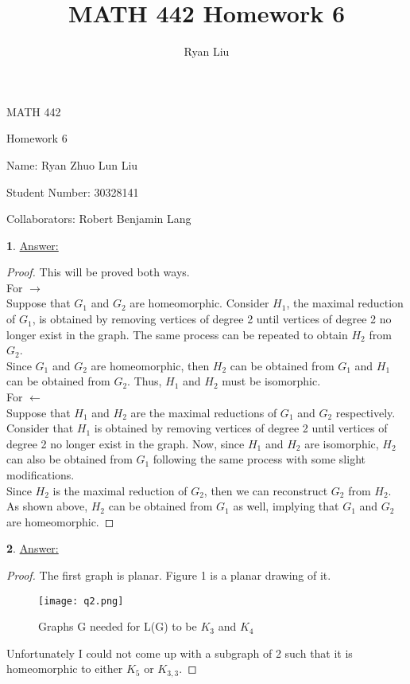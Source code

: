 \documentclass[12pt,a4paper]{article}
\author{Ryan Liu}
\title{MATH 442 Homework 6}
\theoremstyle{definition}
\newtheorem{problem}{}
\begin{document}
\begin{center}
{\huge MATH 442 \par}
{\Large Homework  6  \par}
{\normalsize Name: Ryan Zhuo Lun Liu \par}
{\normalsize Student Number: 30328141 \par}
{\normalsize Collaborators: Robert Benjamin Lang }
\end{center}

\begin{problem} \underline{Answer:}
\begin{proof} This will be proved both ways. \\
For $\rightarrow$ \\
Suppose that $G_1$ and $G_2$ are homeomorphic. Consider $H_1$, the maximal reduction of $G_1$, is obtained by removing vertices of degree 2 until vertices of degree 2 no longer exist in the graph. The same process can be repeated to obtain $H_2$ from $G_2$. \\

Since $G_1$ and $G_2$ are homeomorphic, then $H_2$ can be obtained from $G_1$ and $H_1$ can be obtained from $G_2$. Thus, $H_1$ and $H_2$ must be isomorphic. \\

For $\leftarrow$ \\
Suppose that $H_1$ and $H_2$ are the maximal reductions of $G_1$ and $G_2$ respectively. Consider that $H_1$ is obtained by removing vertices of degree 2 until vertices of degree 2 no longer exist in the graph. Now, since $H_1$ and $H_2$ are isomorphic, $H_2$ can also be obtained from $G_1$ following the same process with some slight modifications. \\

Since $H_2$ is the maximal reduction of $G_2$, then we can reconstruct $G_2$ from $H_2$. As shown above, $H_2$ can be obtained from $G_1$ as well, implying that $G_1$ and $G_2$ are homeomorphic.
\end{proof}
\end{problem}

\begin{problem} \underline{Answer:}
\begin{proof}
The first graph is planar. Figure 1 is a planar drawing of it.

\begin{figure}[H]
    \centering
    \texttt{[image: q2.png]}
    \caption{Graphs G needed for L(G) to be $K_3$ and $K_4$}
    \label{fig:my_label}
\end{figure}

Unfortunately I could not come up with a subgraph of 2 such that it is homeomorphic to either $K_5$ or $K_{3,3}$.
\end{proof}
\end{problem}
\end{document}
